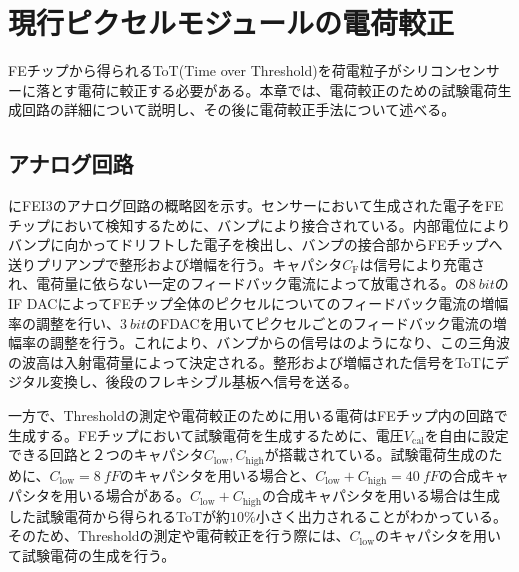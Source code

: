 \chapter{現行ピクセルモジュールの電荷較正}
\label{sec:chap3}

FEチップから得られるToT(Time over Threshold)を荷電粒子がシリコンセンサーに落とす電荷に較正する必要がある。本章では、電荷較正のための試験電荷生成回路の詳細について説明し、その後に電荷較正手法について述べる。

\section{アナログ回路}
\label{sec:analog}
にFEI3のアナログ回路の概略図を示す。センサーにおいて生成された電子をFEチップにおいて検知するために、バンプにより接合されている。内部電位によりバンプに向かってドリフトした電子を検出し、バンプの接合部からFEチップへ送りプリアンプで整形および増幅を行う。キャパシタ$C_\mathrm{F}$は信号により充電され、電荷量に依らない一定のフィードバック電流によって放電される。の$8\ \si{bit}$のIF DACによってFEチップ全体のピクセルについてのフィードバック電流の増幅率の調整を行い、$3\ \si{bit}$のFDACを用いてピクセルごとのフィードバック電流の増幅率の調整を行う。これにより、バンプからの信号はのようになり、この三角波の波高は入射電荷量によって決定される。整形および増幅された信号をToTにデジタル変換し、後段のフレキシブル基板へ信号を送る。

一方で、Thresholdの測定や電荷較正のために用いる電荷はFEチップ内の回路で生成する。FEチップにおいて試験電荷を生成するために、電圧$V_\mathrm{cal}$を自由に設定できる回路と２つのキャパシタ$C_\mathrm{low}, C_\mathrm{high}$が搭載されている。試験電荷生成のために、$C_\mathrm{low}=8\ \si{fF}$のキャパシタを用いる場合と、$C_\mathrm{low}+C_\mathrm{high}=40\ \si{fF}$の合成キャパシタを用いる場合がある。$C_\mathrm{low}+C_\mathrm{high}$の合成キャパシタを用いる場合は生成した試験電荷から得られるToTが約$10\%$小さく出力されることがわかっている。そのため、Thresholdの測定や電荷較正を行う際には、$C_\mathrm{low}$のキャパシタを用いて試験電荷の生成を行う。

